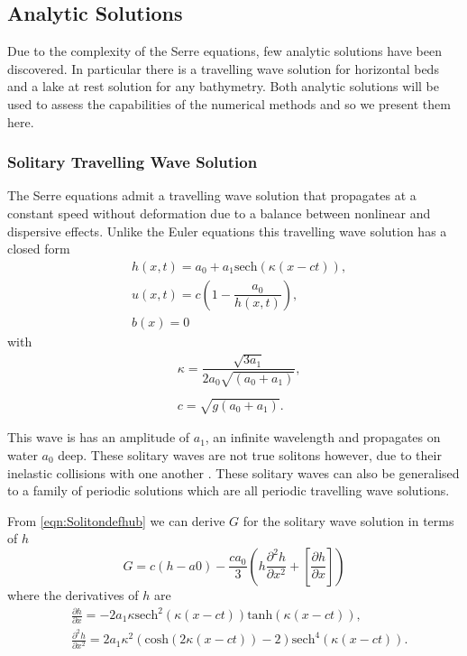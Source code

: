 \subsection{Analytic Solutions}
Due to the complexity of the Serre equations, few analytic solutions have been discovered. In particular there is a travelling wave solution for horizontal beds and a lake at rest solution for any bathymetry. Both analytic solutions will be used to assess the capabilities of the numerical methods and so we present them here. 

\subsubsection{Solitary Travelling Wave Solution}
The Serre equations admit a travelling wave solution that propagates at a constant speed without deformation due to a balance between nonlinear and dispersive effects. Unlike the Euler equations this travelling wave solution has a closed form
\begin{subequations}
	\begin{align}
	&h(x,t) = a_0 + a_1\text{sech}\left(\kappa \left(x - ct\right)\right), \\
	&u(x,t) = c\left(1 - \dfrac{a_0}{h(x,t)}\right), \\
	&b(x) = 0
	\end{align}
	\label{eqn:Solitondefhub}
\end{subequations}
with
\begin{align*}
&\kappa = \dfrac{\sqrt{3a_1}}{2 a_0\sqrt{\left(a_0 + a_1\right)}}, \\ \\
&c = \sqrt{g(a_0 + a_1)}.
\end{align*}

This wave is has an amplitude of $a_1$, an infinite wavelength and propagates on water $a_0$ deep. These solitary waves are not true solitons however, due to their inelastic collisions with one another \cite{Dutykh-etal-2013-761}. These solitary waves can also be generalised to a family of periodic solutions \cite{El-etal-2006} which are all periodic travelling wave solutions. 

From \eqref{eqn:Solitondefhub} we can derive $G$ for the solitary wave solution in terms of $h$
\begin{equation}
G =c(h - a0) - \frac{ca_0}{3} \left(h\frac{\partial^2 h}{\partial x^2 } + \left[\frac{\partial h}{\partial x }\right] \right)
\label{eqn:SolitondefG}
\end{equation}
where the derivatives of $h$ are
\begin{align*}
&\frac{\partial h}{\partial x } = -2 a_1 \kappa \text{sech}^2\left(\kappa \left(x - ct\right)\right) \text{tanh}\left(\kappa \left(x - ct\right)\right),\\
&\frac{\partial^2 h}{\partial x^2 } =  2a_1 \kappa^2 \left(\text{cosh}\left(2\kappa \left(x - ct\right)\right) -2\right)\text{sech}^4\left(\kappa \left(x - ct\right)\right).
\end{align*}

